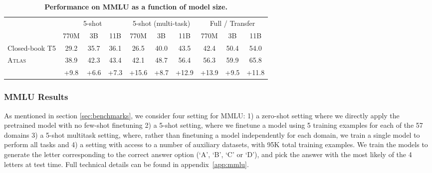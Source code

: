 \documentclass[10pt]{article} \usepackage[preprint]{tmlr}
\newcommand{\Atlas}{\textsc{Atlas}}
\begin{document}
\begin{table}[t]
  \centering
  \caption{\textbf{Performance on MMLU as a function of model size.}}
  \label{table:mmlu_model_size}
  \vspace{0.5em}
  \begin{tabular}{l ccc ccc ccc}
    \toprule
    & \multicolumn{3}{c}{5-shot} & \multicolumn{3}{c}{5-shot (multi-task)} & \multicolumn{3}{c}{Full / Transfer} \\
    \cmidrule(lr){2-4} \cmidrule(lr){5-7} \cmidrule(lr){8-10}
                   & 770M &  3B  & 11B  & 770M &  3B  & 11B & 770M &  3B  & 11B \\
    \midrule
    Closed-book T5 & 29.2 & 35.7 & 36.1 &  26.5    &  40.0 & 43.5  & 42.4 & 50.4 & 54.0\\
    \Atlas           & 38.9	&	42.3	&	43.4	&	42.1	&	48.7	&	56.4	&	56.3	&	59.9	&	65.8 \\
\midrule 
  & +9.8	&	+6.6	&	+7.3	&	+15.6	&	+8.7	&	+12.9	&	+13.9	&	+9.5	&	+11.8\\
    \bottomrule
  \end{tabular}
\end{table}


\subsubsection{MMLU Results} 
As mentioned in section \ref{sec:benchmarks}, we consider four setting for MMLU: 1) a zero-shot setting where we directly apply the pretrained model with no few-shot finetuning  2) a 5-shot setting, where we finetune a model using 5 training examples for each of the 57 domains 3) a 5-shot multitask setting, where, rather than finetuning a model independently for each domain, we train a single  model to perform all tasks and 4) a setting with access to a number of auxiliary datasets, with 95K total training examples.   
We train the models to generate the letter corresponding to the correct answer option (`A', `B', `C' or `D'), and pick the answer with the most likely of the 4 letters at test time. Full technical details can be found in appendix~\ref{app:mmlu}.
\end{document}
